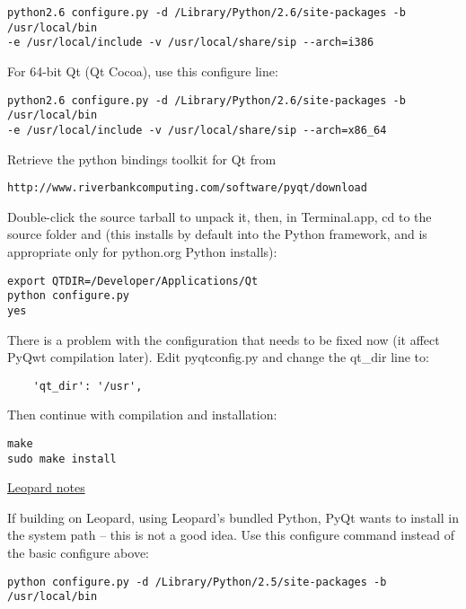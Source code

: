 \begin{verbatim}
python2.6 configure.py -d /Library/Python/2.6/site-packages -b /usr/local/bin 
-e /usr/local/include -v /usr/local/share/sip --arch=i386
\end{verbatim}

For 64-bit Qt (Qt Cocoa), use this configure line:

\begin{verbatim}
python2.6 configure.py -d /Library/Python/2.6/site-packages -b /usr/local/bin
-e /usr/local/include -v /usr/local/share/sip --arch=x86_64
\end{verbatim}

Retrieve the python bindings toolkit for Qt from

\begin{verbatim}
http://www.riverbankcomputing.com/software/pyqt/download
\end{verbatim}

Double-click the source tarball to unpack it, then, in Terminal.app, cd to the source folder
and (this installs by default into the Python framework, and is appropriate only for python.org Python installs):

\begin{verbatim}
export QTDIR=/Developer/Applications/Qt
python configure.py 
yes 
\end{verbatim}

There is a problem with the configuration that needs to be fixed now (it affect PyQwt compilation later).  Edit pyqtconfig.py and change the qt\_dir line to:

\begin{verbatim}
    'qt_dir': '/usr',
\end{verbatim}

Then continue with compilation and installation:

\begin{verbatim}
make 
sudo make install 
\end{verbatim}

\underline{Leopard notes}

If building on Leopard, using Leopard's bundled Python, PyQt wants to install
in the system path -- this is not a good idea.  Use this configure command
instead of the basic configure above:

\begin{verbatim}
python configure.py -d /Library/Python/2.5/site-packages -b /usr/local/bin
\end{verbatim}

